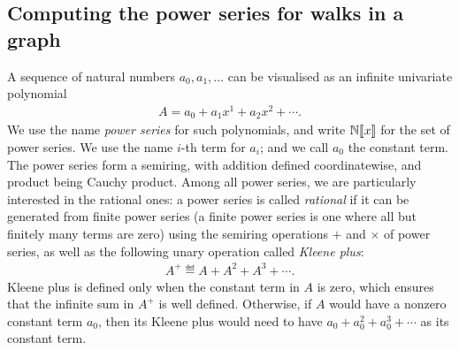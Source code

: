 \subsection{Computing the power series for walks in a graph}
\label{sec:power-series}
A sequence of natural numbers $a_0,a_1,\ldots$ can be visualised as an infinite univariate polynomial
\begin{align*}
 A = a_0 + a_1x^1 + a_2x^2 + \cdots.
\end{align*}
We use the name \emph{power series} for such polynomials, and write $\mathbb N [\![x]\!]$ for the set of power series. 
We use the name $i$-th term for $a_i$; and we call $a_0$ the constant term. The power series form a semiring, with addition defined coordinatewise, and product being Cauchy product. Among all power series, we are particularly interested in the rational ones: a power series is called \emph{rational} if it can be generated from finite power series (a finite power series is one where all but finitely many terms are zero) using the semiring operations $+$ and $\times$ of power series, as well as the following unary  operation called \emph{Kleene plus}:
\begin{align*}
 A^+ \eqdef A + A^2 + A^3 + \cdots.
\end{align*}   
Kleene plus   is defined only when the constant term   in $A$ is zero, which ensures that the infinite sum in $A^+$ is well defined. Otherwise, if $A$ would have a nonzero constant term $a_0$, then its Kleene plus would need to have $a_0 + a_0^2 + a_0^3 + \cdots$ as its constant term.

